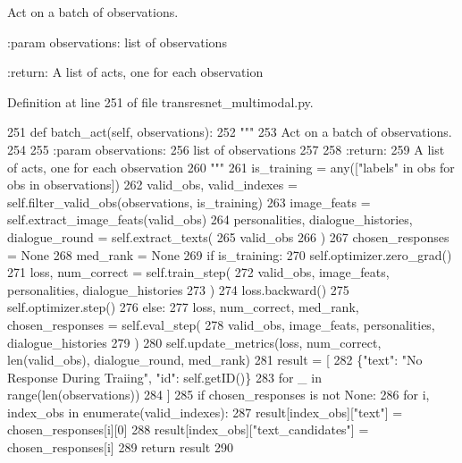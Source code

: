 \begin{DoxyVerb}Act on a batch of observations.

:param observations:
    list of observations

:return:
    A list of acts, one for each observation
\end{DoxyVerb}
 

Definition at line 251 of file transresnet\+\_\+multimodal.\+py.


\begin{DoxyCode}
251     \textcolor{keyword}{def }batch\_act(self, observations):
252         \textcolor{stringliteral}{"""}
253 \textcolor{stringliteral}{        Act on a batch of observations.}
254 \textcolor{stringliteral}{}
255 \textcolor{stringliteral}{        :param observations:}
256 \textcolor{stringliteral}{            list of observations}
257 \textcolor{stringliteral}{}
258 \textcolor{stringliteral}{        :return:}
259 \textcolor{stringliteral}{            A list of acts, one for each observation}
260 \textcolor{stringliteral}{        """}
261         is\_training = any([\textcolor{stringliteral}{"labels"} \textcolor{keywordflow}{in} obs \textcolor{keywordflow}{for} obs \textcolor{keywordflow}{in} observations])
262         valid\_obs, valid\_indexes = self.filter\_valid\_obs(observations, is\_training)
263         image\_feats = self.extract\_image\_feats(valid\_obs)
264         personalities, dialogue\_histories, dialogue\_round = self.extract\_texts(
265             valid\_obs
266         )
267         chosen\_responses = \textcolor{keywordtype}{None}
268         med\_rank = \textcolor{keywordtype}{None}
269         \textcolor{keywordflow}{if} is\_training:
270             self.optimizer.zero\_grad()
271             loss, num\_correct = self.train\_step(
272                 valid\_obs, image\_feats, personalities, dialogue\_histories
273             )
274             loss.backward()
275             self.optimizer.step()
276         \textcolor{keywordflow}{else}:
277             loss, num\_correct, med\_rank, chosen\_responses = self.eval\_step(
278                 valid\_obs, image\_feats, personalities, dialogue\_histories
279             )
280         self.update\_metrics(loss, num\_correct, len(valid\_obs), dialogue\_round, med\_rank)
281         result = [
282             \{\textcolor{stringliteral}{"text"}: \textcolor{stringliteral}{"No Response During Traiing"}, \textcolor{stringliteral}{"id"}: self.getID()\}
283             \textcolor{keywordflow}{for} \_ \textcolor{keywordflow}{in} range(len(observations))
284         ]
285         \textcolor{keywordflow}{if} chosen\_responses \textcolor{keywordflow}{is} \textcolor{keywordflow}{not} \textcolor{keywordtype}{None}:
286             \textcolor{keywordflow}{for} i, index\_obs \textcolor{keywordflow}{in} enumerate(valid\_indexes):
287                 result[index\_obs][\textcolor{stringliteral}{"text"}] = chosen\_responses[i][0]
288                 result[index\_obs][\textcolor{stringliteral}{"text\_candidates"}] = chosen\_responses[i]
289         \textcolor{keywordflow}{return} result
290 
\end{DoxyCode}
